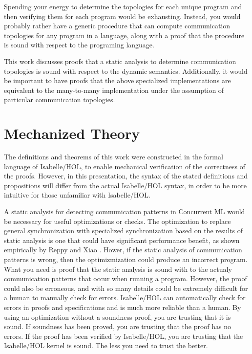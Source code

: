 \documentclass[letterpaper, 11pt]{extarticle}
\begin{document}
Spending your energy to determine the topologies for each unique program and then verifying
them for each program would be exhausting. Instead, you would probably rather have a generic
procedure that can compute communication topologies for any program in a language, along with
a proof that the procedure is sound with respect to the programing language.

This work discusses proofs that a static analysis to determine communication topologies is
sound with respect to the dynamic semantics.
Additionally, it would be important to have proofs that the above specialized
implementations are equivalent to the many-to-many implementation under the assumption of
particular communication topologies.

\section{Mechanized Theory}

The definitions and theorems of this work were constructed in the formal
language of Isabelle/HOL,
to enable mechanical verification of the correctness of the proofs.
However, in this presentation, the syntax of the stated definitions and propositions will differ from
the actual Isabelle/HOL syntax, in order to be more intuitive for those unfamiliar
with Isabelle/HOL.

A static analysis for detecting communication patterns in Concurrent ML would be necessary for useful
optimizations or checks. The optimization to replace general synchronization with specialized synchronization
based on the results of static analysis is one that could have significant performance benefit, as shown
empirically by Reppy and Xiao \cite{}. Hower, if the static analysis of communication patterns is wrong, then
the optimizmization could produce an incorrect program. What you need is proof that the static analysis is sound
with to the actualy communication patterns that occur when running a program.  However, the proof could also be
erroneous, and with so many details could be extremely difficult for a human to manually check for errors.
Isabelle/HOL can automatically check for errors in proofs and specifications and is much more reliable than a
human. By using an optimization without a soundness proof, you are trusting that it is sound.  If soundness has
been proved, you are trusting that the proof has no errors. If the proof has been verified by Isabelle/HOL, you are
trusting that the Isabelle/HOL kernel is sound. The less you need to trust the better.
\end{document}
